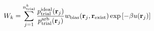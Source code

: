 \documentclass[12pt]{article}
\begin{document}
\begin{displaymath}
W_k = \sum_{j=1}^{n_{\rm trial}^k}
{{p_{\rm trial}^{\rm ideal}({\bf r}_j)}\over{ p_{\rm trial}^{\rm arb}({\bf r}_j)}}
w_{\rm bias}({{\bf r}_j},{\bf r}_{\rm exist})
\exp\left[-\beta u({\bf r}_j)\right]
\end{displaymath}
\end{document}
